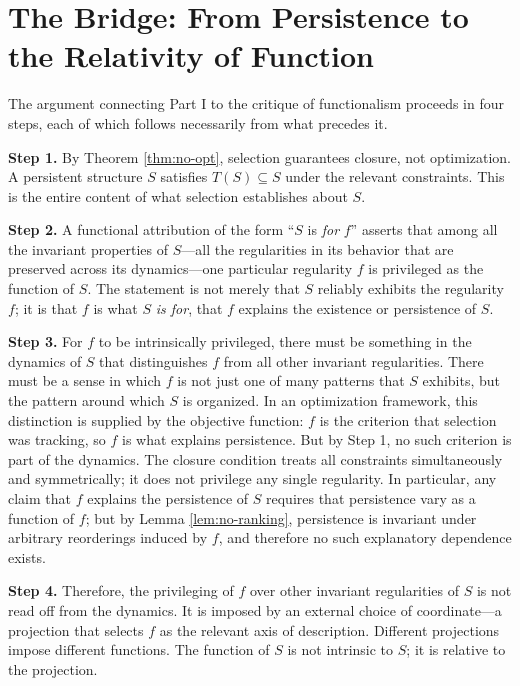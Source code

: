 \documentclass[12pt, a4paper, oneside]{article}
\theoremstyle{plain}
\theoremstyle{definition}
\theoremstyle{remark}
\newcommand{\T}{T}
\begin{document}
\section{The Bridge: From Persistence to the Relativity of Function}

The argument connecting Part I to the critique of functionalism proceeds in four steps, each of which follows necessarily from what precedes it.

\textbf{Step 1.} By Theorem \ref{thm:no-opt}, selection guarantees closure, not optimization. A persistent structure $S$ satisfies $\T(S) \subseteq S$ under the relevant constraints. This is the entire content of what selection establishes about $S$.

\textbf{Step 2.} A functional attribution of the form ``$S$ is \emph{for} $f$'' asserts that among all the invariant properties of $S$---all the regularities in its behavior that are preserved across its dynamics---one particular regularity $f$ is privileged as the function of $S$. The statement is not merely that $S$ reliably exhibits the regularity $f$; it is that $f$ is what $S$ \emph{is for}, that $f$ explains the existence or persistence of $S$.

\textbf{Step 3.} For $f$ to be intrinsically privileged, there must be something in the dynamics of $S$ that distinguishes $f$ from all other invariant regularities. There must be a sense in which $f$ is not just one of many patterns that $S$ exhibits, but the pattern around which $S$ is organized. In an optimization framework, this distinction is supplied by the objective function: $f$ is the criterion that selection was tracking, so $f$ is what explains persistence. But by Step 1, no such criterion is part of the dynamics. The closure condition treats all constraints simultaneously and symmetrically; it does not privilege any single regularity. In particular, any claim that $f$ explains the persistence of $S$ requires that persistence vary as a function of $f$; but by Lemma \ref{lem:no-ranking}, persistence is invariant under arbitrary reorderings induced by $f$, and therefore no such explanatory dependence exists.

\textbf{Step 4.} Therefore, the privileging of $f$ over other invariant regularities of $S$ is not read off from the dynamics. It is imposed by an external choice of coordinate---a projection that selects $f$ as the relevant axis of description. Different projections impose different functions. The function of $S$ is not intrinsic to $S$; it is relative to the projection.
\end{document}
